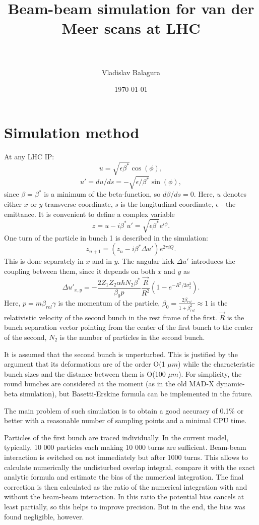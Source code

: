 \documentclass[paper=a4, fontsize=11pt]{scrartcl} %
\title{
\normalfont \normalsize
\huge Beam-beam simulation for van der Meer scans  at LHC\\ %
\horrule{2pt} \\[0.5cm] %
}
\author{Vladislav Balagura} %
\date{\normalsize\today} %
\numberwithin{equation}{section} %
\numberwithin{figure}{section} %
\numberwithin{table}{section} %
\begin{document}
\maketitle %

\section{Simulation method}


At any LHC IP:
\[ u = \sqrt{\epsilon \beta^*} \cos(\phi), \]
\[ u' = du/ds = -\sqrt{\epsilon /\beta^*} \sin(\phi), \]
since $\beta = \beta^*$ is a minimum of the beta-function, so $d \beta/ds = 0$.
Here, $u$ denotes either $x$ or $y$ transverse coordinate, 
$s$ is the longitudinal coordinate, $\epsilon$ - the emittance.
It is convenient to define a complex variable
\[ z = u - i\beta^* u' = \sqrt{\epsilon \beta^*} e^{i \phi}. \]
One turn of the particle in bunch 1 is described in the simulation:
\[ z_{n+1} = (z_n - i \beta^* \Delta u') e^{2\pi i Q}. \]
This is done separately in $x$ and in $y$. The angular kick $\Delta u'$
introduces the coupling between them, since it depends on both $x$ and $y$ as
\[ \Delta u'_{x,y} =
-\frac{2 Z_1 Z_2 \alpha \hbar N_2 \beta^*}{\beta_0 p} \frac{\vec{R}}{R^2} (1 -
e^{-R^2/2\sigma_2^2}). \] Here, $p = m\beta_{rel}\gamma$ is the momentum of
the particle, $\beta_0 =\frac{2\beta_{rel}}{1+\beta_{rel}^2} \approx 1$ is the
relativistic velocity of the second bunch in the rest frame of the
first. $\vec{R}$ is the bunch separation vector pointing from the center of
the first bunch to the center of the second, $N_2$ is the number of particles
in the second bunch.

It is assumed that the second bunch is unperturbed. This is justified by the
argument that its deformations are of the order O(1 $\mu m$) while the
characteristic bunch sizes and the distance between them is O(100 $\mu m$). For
simplicity, the round bunches are considered at the moment (as in the old
MAD-X dynamic-beta simulation), but Basetti-Erskine formula can be implemented
in the future.
 
The main problem of such simulation is to obtain a good accuracy of 0.1\%
or better with a reasonable number of sampling points and a minimal CPU time.

Particles of the first bunch are traced individually. In the current model,
typically, 10 000 particles each making 10 000 turns are sufficient.
Beam-beam interaction is switched on not immediately but after 1000
turns. This allows to calculate numerically the undisturbed overlap integral,
compare it with the exact analytic formula and estimate the bias of the
numerical integration. The final correction is then calculated as the ratio of
the numerical integration with and without the beam-beam interaction. In this
ratio the potential bias cancels at least partially, so this helps to improve
precision. But in the end, the bias was found negligible, however.
\end{document}
